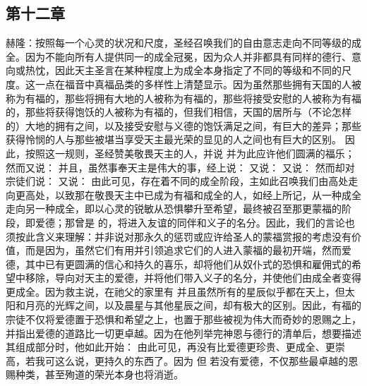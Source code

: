 \subsection{第十二章}

\par

赫隆：按照每一个心灵的状况和尺度，圣经召唤我们的自由意志走向不同等级的成全。因为不能向所有人提供同一的成全冠冕，因为众人并非都具有同样的德行、意向或热忱，因此天主圣言在某种程度上为成全本身指定了不同的等级和不同的尺度。这一点在福音中真福品类的多样性上清楚显示。因为虽然那些拥有天国的人被称为有福的，那些将拥有大地的人被称为有福的，那些将接受安慰的人被称为有福的，那些将获得饱饫的人被称为有福的，但我们相信，天国的居所与（不论怎样的）大地的拥有之间，以及接受安慰与义德的饱饫满足之间，有巨大的差异；那些获得怜悯的人与那些被堪当享受天主最光荣的显见的人之间也有巨大的区别。  因此，按照这一规则，圣经赞美敬畏天主的人，并说 并为此应许他们圆满的福乐；然而又说：  并且，虽然事奉天主是伟大的事，经上说： 又说： 又说： 然而却对宗徒们说：  又说：  由此可见，存在着不同的成全阶段，主如此召唤我们由高处走向更高处，以致那在敬畏天主中已成为有福和成全的人，如经上所记，从一种成全走向另一种成全，即以心灵的锐敏从恐惧攀升至希望，最终被召至那更蒙福的阶段，即爱德；那曾是  的，将进入友谊的同伴和义子的名分。因此，我们的言论也须按此含义来理解：并非说对那永久的惩罚或应许给圣人的蒙福赏报的考虑没有价值，而是因为，虽然它们有用并引领追求它们的人进入蒙福的最初开端，然而爱德，其中已有更圆满的信心和持久的喜乐，却将他们从奴仆式的恐惧和雇佣式的希望中移除，导向对天主的爱德，并将他们带入义子的名分，并使他们由成全者变得更成全。因为救主说，在祂父的家里有  并且虽然所有的星辰似乎都在天上，但太阳和月亮的光辉之间，以及晨星与其他星辰之间，却有极大的区别。因此，有福的宗徒不仅将爱德置于恐惧和希望之上，也置于那些被视为伟大而奇妙的恩赐之上，并指出爱德的道路比一切更卓越。因为在他列举完神恩与德行的清单后，想要描述其组成部分时，他如此开始： 由此可见，再没有比爱德更珍贵、更成全、更崇高，若我可这么说，更持久的东西了。因为 但 若没有爱德，不仅那些最卓越的恩赐种类，甚至殉道的荣光本身也将消逝。\par


